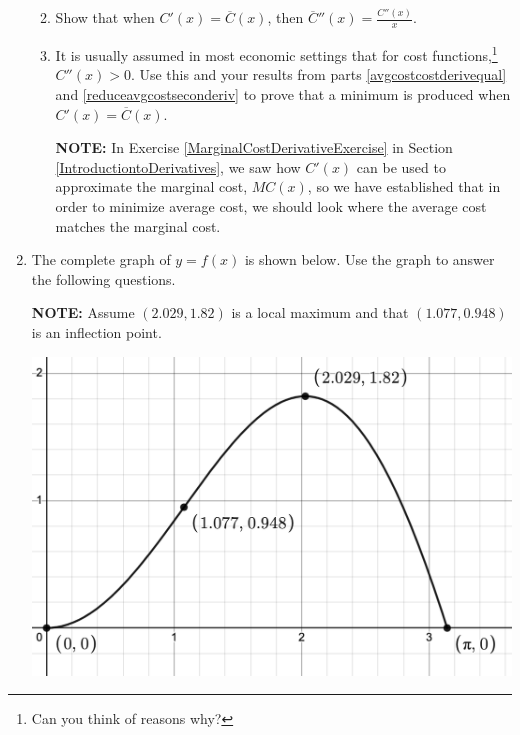 \begin{enumerate}
\begin{enumerate}
\smallskip

\item\label{reduceavgcostseconderiv}  Show that when $C'(x) = \overline{C}(x)$, then $\overline{C}''(x)  = \frac{C''(x)}{x}$.

\smallskip

\item  It is usually assumed in most economic settings that for cost functions,\footnote{Can you think of reasons why?} $C''(x) > 0$.   Use this and your results from parts \ref{avgcostcostderivequal} and \ref{reduceavgcostseconderiv} to prove that a minimum is produced  when $C'(x) = \overline{C}(x)$.  

\smallskip

\textbf{NOTE:} In Exercise \ref{MarginalCostDerivativeExercise} in Section \ref{IntroductiontoDerivatives}, we saw how $C'(x)$ can be used to approximate the marginal cost, $MC(x)$, so we have established that in order to minimize average cost, we should look where the average cost matches the marginal cost.


\end{enumerate}

\item  The complete graph of $y = f(x)$ is shown below. Use the graph to answer the following questions.

\smallskip


\textbf{NOTE:} Assume $(2.029, 1.82)$ is a local maximum and that $(1.077, 0.948)$ is an inflection point.


\smallskip

\centerline{\includegraphics[width = 5in]{./AppDerivativesGraphics/T04Graph.PNG}}

\smallskip


\end{enumerate}
